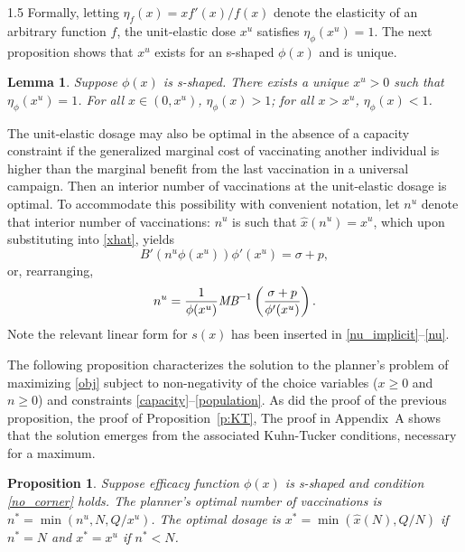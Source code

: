 \documentclass[12pt]{article}
\newcommand{\efficacy}{\phi}
\newcommand{\side}{s}
\newcommand{\xh}{\hat{x}}
\newcommand{\benefit}{B}
\newcommand{\MB}{\text{\it MB}}
\newcommand{\elasticity}[1]{\eta_{#1}}
\newtheorem{lemma}{Lemma}
\newtheorem{proposition}{Proposition}
\begin{document}
\begin{spacing}{1.5}
Formally, letting $\elasticity{f}(x) = x f'(x) / f(x)$ denote the elasticity of an arbitrary function $f$, the unit-elastic dose $x^u$ satisfies $\elasticity{\efficacy}(x^u) = 1$. The next proposition shows that $x^u$ exists for an s-shaped $\efficacy(x)$ and is unique. 

\begin{lemma}
\label{l:s-shaped}
\singlespace
Suppose $\efficacy(x)$ is s-shaped. There exists a unique $x^u > 0$ such that $\elasticity{\efficacy}(x^u) = 1$. For all $x \in (0, x^u)$, $\elasticity{\efficacy}(x) > 1$; for all $x > x^u$, $\elasticity{\efficacy}(x) < 1$. 
\end{lemma}

The unit-elastic dosage may also be optimal in the absence of a capacity constraint if the generalized marginal cost of vaccinating another individual is higher than the marginal benefit from the last vaccination in a universal campaign. Then an interior number of vaccinations at the unit-elastic dosage is optimal. To accommodate this possibility with convenient notation, let $n^u$ denote that interior number of vaccinations: $n^u$ is such that $\xh(n^u) = x^u$, which upon substituting into \eqref{xhat}, yields
\begin{equation}
\label{nu_implicit}
\benefit'(n^u \efficacy(x^u)) \efficacy'(x^u) = \sigma + p,
\end{equation}
or, rearranging,
\begin{equation}
\label{nu}
n^u = \frac{1}{\efficacy(x^u)} \MB^{-1} \left( \frac{\sigma + p}{\efficacy'(x^u)} \right).
\end{equation}
\noindent Note the relevant linear form for $\side(x)$ has been inserted in \eqref{nu_implicit}--\eqref{nu}. 

The following proposition characterizes the solution to the planner's problem of maximizing \eqref{obj} subject to non-negativity of the choice variables ($x \geq 0$ and $n \geq 0$) and constraints \eqref{capacity}--\eqref{population}. As did the proof of the previous proposition, the proof of Proposition~\ref{p:KT}, The proof in Appendix~A shows that the solution emerges from the associated Kuhn-Tucker conditions, necessary  for a maximum. 
\begin{proposition}
\label{p:s-shaped}
\singlespace
Suppose efficacy function $\efficacy(x)$ is s-shaped and condition \eqref{no_corner} holds. The planner's optimal number of vaccinations is $n^* = \min(n^u, N, Q/x^u)$. The optimal dosage is $x^* = \min(\xh(N), Q/N)$ if $n^* = N$ and $x^* = x^u$ if $n^* < N$. 
\end{proposition}


\end{spacing}
\end{document}
